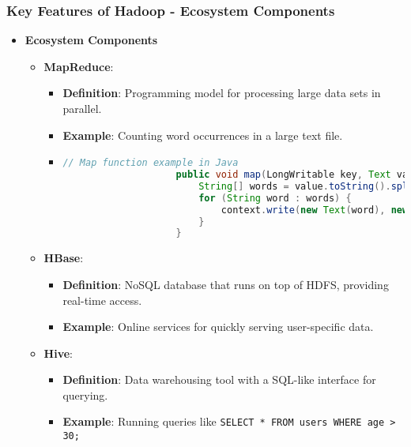 \documentclass[aspectratio=169]{beamer}
\begin{document}
\begin{frame}
    \frametitle{Key Features of Hadoop - Ecosystem Components}
    \begin{itemize}
        \item \textbf{Ecosystem Components}
        \begin{itemize}
            \item \textbf{MapReduce}:
            \begin{itemize}
                \item \textbf{Definition}: Programming model for processing large data sets in parallel.
                \item \textbf{Example}: Counting word occurrences in a large text file.
                \item \begin{lstlisting}[language=Java]
                    // Map function example in Java
                    public void map(LongWritable key, Text value, Context context) {
                        String[] words = value.toString().split(" ");
                        for (String word : words) {
                            context.write(new Text(word), new IntWritable(1));
                        }
                    }
                \end{lstlisting}
            \end{itemize}
            \item \textbf{HBase}:
            \begin{itemize}
                \item \textbf{Definition}: NoSQL database that runs on top of HDFS, providing real-time access.
                \item \textbf{Example}: Online services for quickly serving user-specific data.
            \end{itemize}
            \item \textbf{Hive}:
            \begin{itemize}
                \item \textbf{Definition}: Data warehousing tool with a SQL-like interface for querying.
                \item \textbf{Example}: Running queries like \texttt{SELECT * FROM users WHERE age > 30;}
            \end{itemize}
        \end{itemize}
    \end{itemize}
\end{frame}
\end{document}
